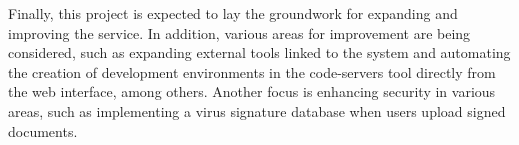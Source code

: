 Finally, this project is expected to lay the groundwork for expanding and improving the service. In addition, various areas for improvement are being considered, such as expanding external tools linked to the system and automating the creation of development environments in the code-servers tool directly from the web interface, among others. Another focus is enhancing security in various areas, such as implementing a virus signature database when users upload signed documents.


